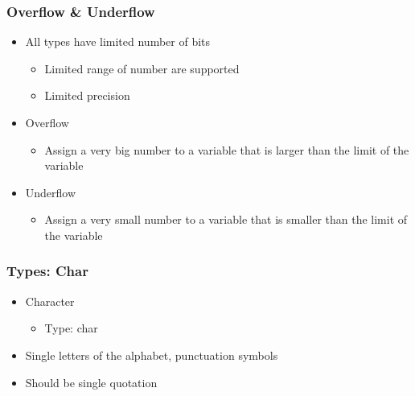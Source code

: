 \documentclass{../c-lecture}
\begin{document}
\begin{frame}
  \frametitle{Overflow \& Underflow}
  \begin{itemize}
    \item All types have limited number of bits
    \begin{itemize}
      \item Limited range of number are supported
      \item Limited precision
    \end{itemize}
    \item Overflow
    \begin{itemize}
      \item
        Assign a very big number to a variable that is larger than the limit of
        the variable
    \end{itemize}
    \item Underflow
    \begin{itemize}
      \item
        Assign a very small number to a variable that is smaller than the limit
        of the variable
    \end{itemize}
  \end{itemize}
\end{frame}

\begin{frame}
  \frametitle{Types: Char}
  \begin{itemize}
    \item Character
    \begin{itemize}
      \item Type: char
    \end{itemize}
    \item Single letters of the alphabet, punctuation symbols
    \item Should be single quotation
  \end{itemize}
\end{frame}
\end{document}
